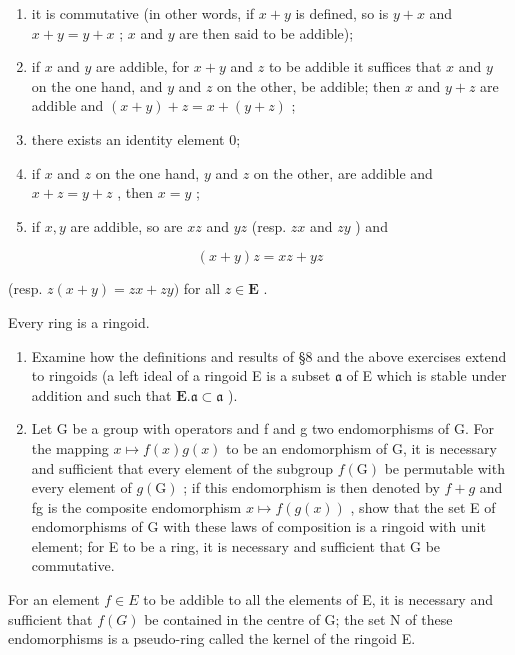 \begin{enumerate}
\def\labelenumi{(\arabic{enumi})}
\item
  it is commutative (in other words, if \(x + y\) is defined, so is \(y + x\) and \(x + y = y + x\) ; \(x\) and \(y\) are then said to be addible);
\item
  if \(x\) and \(y\) are addible, for \(x + y\) and \(z\) to be addible it suffices that \(x\) and \(y\) on the one hand, and \(y\) and \(z\) on the other, be addible; then \(x\) and \(y + z\) are addible and \((x + y) + z = x + (y + z)\) ;
\item
  there exists an identity element 0;
\item
  if \(x\) and \(z\) on the one hand, \(y\) and \(z\) on the other, are addible and \(x + z = y + z\) , then \(x = y\) ;
\item
  if \(x, y\) are addible, so are \(xz\) and \(yz\) (resp. \(zx\) and \(zy\) ) and
\end{enumerate}

\[
(x + y) z = x z + y z
\]

(resp. \(z(x + y) = zx + zy)\) for all \(z \in \mathbf{E}\) .

Every ring is a ringoid.

\begin{enumerate}
\def\labelenumi{(\alph{enumi})}
\item
  Examine how the definitions and results of §8 and the above exercises extend to ringoids (a left ideal of a ringoid E is a subset \(\mathfrak{a}\) of E which is stable under addition and such that \(\mathbf{E}.\mathfrak{a}\subset \mathfrak{a}\) ).
\item
  Let G be a group with operators and f and g two endomorphisms of G. For the mapping \(x \mapsto f(x)g(x)\) to be an endomorphism of G, it is necessary and sufficient that every element of the subgroup \(f(\mathrm{G})\) be permutable with every element of \(g(\mathrm{G})\) ; if this endomorphism is then denoted by \(f + g\) and fg is the composite endomorphism \(x \mapsto f(g(x))\) , show that the set E of endomorphisms of G with these laws of composition is a ringoid with unit element; for E to be a ring, it is necessary and sufficient that G be commutative.
\end{enumerate}

For an element \(f \in E\) to be addible to all the elements of E, it is necessary and sufficient that \(f(G)\) be contained in the centre of G; the set N of these endomorphisms is a pseudo-ring called the kernel of the ringoid E.

